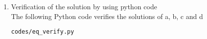 \begin{enumerate}[label=\thesection.\arabic*.,ref=\thesection.\theenumi]
%
%
%
\item Verification of the solution by using python code	
\\
\solution The  following Python code verifies the solutions of a, b, c and d
%
\begin{lstlisting}
codes/eq_verify.py
\end{lstlisting}


\end{enumerate}
